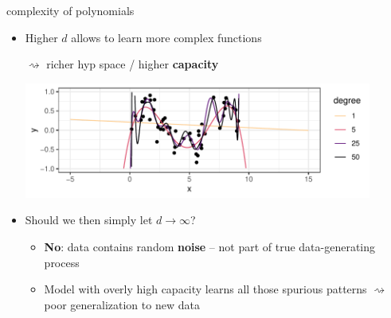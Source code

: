 \documentclass[11pt,compress,t,notes=noshow, xcolor=table]{beamer}
\begin{document}
\begin{vbframe}{complexity of polynomials}

\begin{itemize}
  \item Higher $d$ allows to learn more complex functions 
  
  $\rightsquigarrow$ richer hyp space / higher \textbf{capacity}
  
  \vfill
  \includegraphics[width=0.9\textwidth]{figure/reg_poly_univ_4}
  \item Should we then simply let $d \rightarrow \infty$?
  \begin{itemize}
    \item \textbf{No}: data contains random \textbf{noise} -- not part of true
    data-generating process
    \item Model with overly high capacity learns all those spurious patterns
    $\rightsquigarrow$ poor generalization to new data
  \end{itemize}
\end{itemize}

\end{vbframe}


\end{document}
